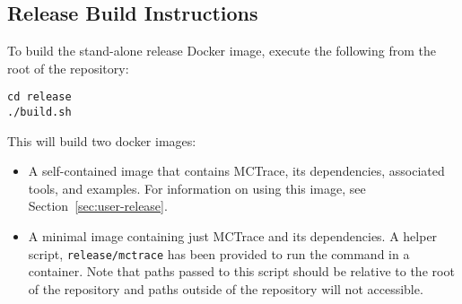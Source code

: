 \subsection{Release Build Instructions}
\label{sec:rele-build-instr}

To build the stand-alone release Docker image, execute the following from the root
of the repository:

\begin{verbatim}
cd release
./build.sh
\end{verbatim}

This will build two docker images: 
\begin{itemize}
\item A self-contained image that contains MCTrace, its dependencies,
  associated tools, and examples. For information on using this image,
  see Section~\ref{sec:user-release}.

\item A minimal image containing just MCTrace and its dependencies. A
  helper script, \texttt{release/mctrace} has been provided to run the
  command in a container. Note that paths passed to this script should
  be relative to the root of the repository and paths outside of the
  repository will not accessible. 
\end{itemize}

